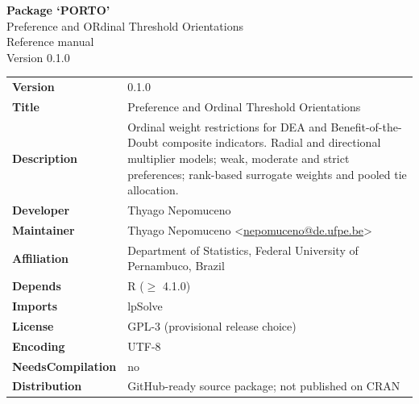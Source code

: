 \documentclass[10pt,a4paper]{article}
\begin{document}
\thispagestyle{plain}
\begin{center}
{\LARGE\bfseries Package `PORTO'}\\[8pt]
{\large Preference and ORdinal Threshold Orientations}\\[5pt]
Reference manual\\[6pt]
Version 0.1.0
\end{center}
\vspace{4pt}
\begin{tabular}{@{}p{36mm}p{119mm}@{}}
\textbf{Version} & 0.1.0 \\
\textbf{Title} & Preference and Ordinal Threshold Orientations \\
\textbf{Description} & Ordinal weight restrictions for DEA and Benefit-of-the-Doubt composite indicators. Radial and directional multiplier models; weak, moderate and strict preferences; rank-based surrogate weights and pooled tie allocation. \\
\textbf{Developer} & Thyago Nepomuceno \\
\textbf{Maintainer} & Thyago Nepomuceno \textless{}\href{mailto:nepomuceno@de.ufpe.be}{nepomuceno@de.ufpe.be}\textgreater{} \\
\textbf{Affiliation} & Department of Statistics, Federal University of Pernambuco, Brazil \\
\textbf{Depends} & R ($\geq$ 4.1.0) \\
\textbf{Imports} & lpSolve \\
\textbf{License} & GPL-3 (provisional release choice) \\
\textbf{Encoding} & UTF-8 \\
\textbf{NeedsCompilation} & no \\
\textbf{Distribution} & GitHub-ready source package; not published on CRAN \\
\end{tabular}
\vspace{8pt}
\tableofcontents
\clearpage
\end{document}
